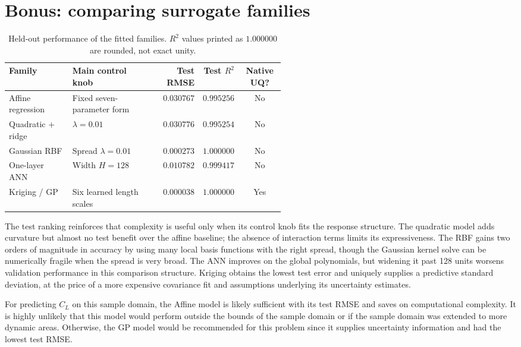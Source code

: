 \documentclass[11pt]{article}
\newcommand{\toprule}{\hline}
\newcommand{\midrule}{\hline}
\newcommand{\bottomrule}{\hline}
\begin{document}
\section{Bonus: comparing surrogate families}
\begin{table}[h]
\centering
\caption{Held-out performance of the fitted families. $R^2$ values printed as $1.000000$ are rounded, not exact unity.}
\label{tab:comparison}
\begin{tabular}{p{0.23\linewidth}p{0.31\linewidth}rrc}
\toprule
Family & Main control knob & Test RMSE & Test $R^2$ & Native UQ? \\
\midrule
Affine regression & Fixed seven-parameter form & $0.030767$ & $0.995256$ & No \\
Quadratic + ridge & $\lambda=0.01$ & $0.030776$ & $0.995254$ & No \\
Gaussian RBF & Spread $\lambda=0.01$ & $0.000273$ & $1.000000$ & No \\
One-layer ANN & Width $H=128$ & $0.010782$ & $0.999417$ & No \\
Kriging / GP & Six learned length scales & $0.000038$ & $1.000000$ & Yes \\
\bottomrule
\end{tabular}
\end{table}

The test ranking reinforces that complexity is useful only when its control knob fits the response structure. The quadratic model adds curvature but almost no test benefit over the affine baseline; the absence of interaction terms limits its expressiveness. The RBF gains two orders of magnitude in accuracy by using many local basis functions with the right spread, though the Gaussian kernel solve can be numerically fragile when the spread is very broad. The ANN improves on the global polynomials, but widening it past 128 units worsens validation performance in this comparison structure. Kriging obtains the lowest test error and uniquely supplies a predictive standard deviation, at the price of a more expensive covariance fit and assumptions underlying its uncertainty estimates.

For predicting $C_L$ on this sample domain, the Affine model is likely sufficient with its test RMSE and saves on computational complexity. It is highly unlikely that this model would perform outside the bounds of the sample domain or if the sample domain was extended to more dynamic areas. Otherwise, the GP model would be recommended for this problem since it supplies uncertainty information and had the lowest test RMSE.
\end{document}
